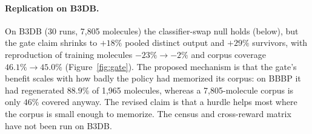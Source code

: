 \documentclass[10pt,letterpaper]{article}
\begin{document}
\paragraph{Replication on B3DB.} On B3DB (30 runs, 7{,}805 molecules) the classifier-swap null holds (below), but the gate claim shrinks to $+18\%$ pooled distinct output and $+29\%$ survivors, with reproduction of training molecules $-23\%\to-2\%$ and corpus coverage $46.1\%\to45.0\%$ (Figure~\ref{fig:gate}). The proposed mechanism is that the gate's benefit scales with how badly the policy had memorized its corpus: on BBBP it had regenerated $88.9\%$ of 1{,}965 molecules, whereas a 7{,}805-molecule corpus is only $46\%$ covered anyway. The revised claim is that a hurdle helps most where the corpus is small enough to memorize. The census and cross-reward matrix have not been run on B3DB.
\end{document}
